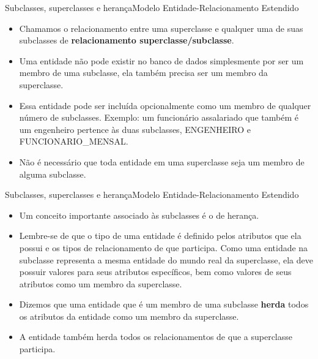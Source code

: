 \documentclass[t]{beamer}
\begin{document}

\begin{ftst}{Subclasses, superclasses e herança}{Modelo Entidade-Relacionamento Estendido}
\small
\begin{itemize}
    \item Chamamos o relacionamento entre uma superclasse e qualquer uma de suas subclasses de \textbf{relacionamento superclasse/subclasse}.
    \item Uma entidade não pode existir no banco de dados simplesmente por ser um membro de uma subclasse, ela também precisa ser um membro da superclasse.
    \item Essa entidade pode ser incluída opcionalmente como um membro de qualquer número de subclasses. Exemplo: um funcionário assalariado que também é um engenheiro pertence às duas subclasses, ENGENHEIRO e FUNCIONARIO\_MENSAL.
    \item Não é necessário que toda entidade em uma superclasse seja um membro de alguma subclasse.
\end{itemize}
\end{ftst}


\begin{ftst}{Subclasses, superclasses e herança}{Modelo Entidade-Relacionamento Estendido}
\small
\begin{itemize}
    \item Um conceito importante associado às subclasses é o de herança.
    \item Lembre-se de que o tipo de uma entidade é definido pelos atributos que ela possui e os tipos de relacionamento de que participa. Como uma entidade na subclasse representa a mesma entidade do mundo real da superclasse, ela deve possuir valores para seus atributos específicos, bem como valores de seus atributos como um membro da superclasse. 
    \item Dizemos que uma entidade que é um membro de uma subclasse \textbf{herda} todos os atributos da entidade como um membro da superclasse.
    \item A entidade também herda todos os relacionamentos de que a superclasse participa.
\end{itemize}
\end{ftst}

\end{document}
